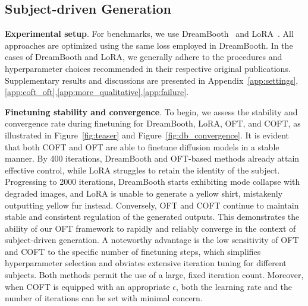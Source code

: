 \subsection{Subject-driven Generation}

\textbf{Experimental setup}. For benchmarks, we use DreamBooth~\cite{ruiz2023dreambooth} and LoRA~\cite{hulora2022}. All approaches are optimized using the same loss employed in DreamBooth. In the cases of DreamBooth and LoRA, we generally adhere to the procedures and hyperparameter choices recommended in their respective original publications. Supplementary results and discussions are presented in Appendix~\ref{app:settings},\ref{app:coft_oft},\ref{app:more_qualitative},\ref{app:failure}.

\textbf{Finetuning stability and convergence}. To begin, we assess the stability and convergence rate during finetuning for DreamBooth, LoRA, OFT, and COFT, as illustrated in Figure~\ref{fig:teaser} and Figure~\ref{fig:db_convergence}. It is evident that both COFT and OFT are able to finetune diffusion models in a stable manner. By 400 iterations, DreamBooth and OFT-based methods already attain effective control, while LoRA struggles to retain the identity of the subject. Progressing to 2000 iterations, DreamBooth starts exhibiting mode collapse with degraded images, and LoRA is unable to generate a yellow shirt, mistakenly outputting yellow fur instead. Conversely, OFT and COFT continue to maintain stable and consistent regulation of the generated outputs. This demonstrates the ability of our OFT framework to rapidly and reliably converge in the context of subject-driven generation. A noteworthy advantage is the low sensitivity of OFT and COFT to the specific number of finetuning steps, which simplifies hyperparameter selection and obviates extensive iteration tuning for different subjects. Both methods permit the use of a large, fixed iteration count. Moreover, when COFT is equipped with an appropriate $\epsilon$, both the learning rate and the number of iterations can be set with minimal concern.

